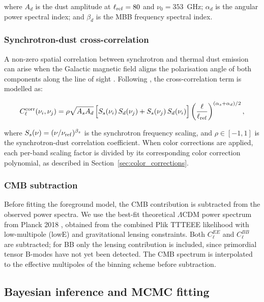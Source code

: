 where $A_d$ is the dust amplitude at $\ell_{\rm ref} = 80$ and $\nu_0 = 353$~GHz; $\alpha_d$ is the angular power spectral index; and $\beta_d$ is the MBB frequency spectral index.

\subsubsection{Synchrotron-dust cross-correlation}

A non-zero spatial correlation between synchrotron and thermal dust emission can arise when the Galactic magnetic field aligns the polarisation angle of both components along the line of sight \citep{Choi_2015}. Following \citet{Planck_2016XXX}, the cross-correlation term is modelled as:

\begin{equation}
\begin{split}
C_\ell^{\rm corr}(\nu_i, \nu_j) = \rho \sqrt{A_s A_d}\,
\Big[ S_s(\nu_i)\, S_d(\nu_j) + S_s(\nu_j)\, S_d(\nu_i) \Big]
\left(\frac{\ell}{\ell_{\rm ref}}\right)^{(\alpha_s + \alpha_d)/2},
\end{split}
\end{equation}

where $S_s(\nu) = (\nu/\nu_{\rm ref})^{\beta_s}$ is the synchrotron frequency scaling, and $\rho \in [-1, 1]$ is the synchrotron-dust correlation coefficient. When color corrections are applied, each per-band scaling factor is divided by its corresponding color correction polynomial, as described in Section~\ref{sec:color_corrections}.

\subsubsection{CMB subtraction}

Before fitting the foreground model, the CMB contribution is subtracted from the observed power spectra. We use the best-fit theoretical $\Lambda$CDM power spectrum from Planck 2018 \citep{Planck_2018VI}, obtained from the combined Plik TTTEEE likelihood with low-multipole (lowE) and gravitational lensing constraints. Both $C_\ell^{EE}$ and $C_\ell^{BB}$ are subtracted; for BB only the lensing contribution is included, since primordial tensor B-modes have not yet been detected. The CMB spectrum is interpolated to the effective multipoles of the binning scheme before subtraction.

\subsection{Bayesian inference and MCMC fitting}
\label{sec:mcmc}

